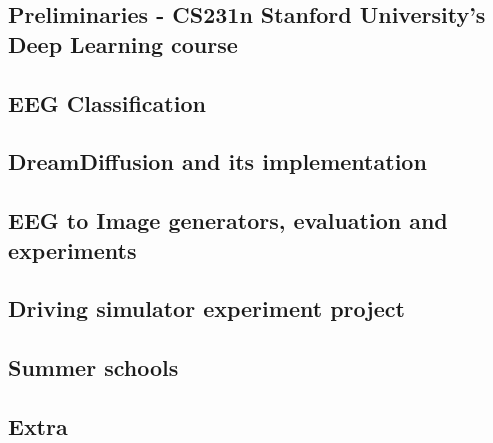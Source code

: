 \subsection{Preliminaries - CS231n Stanford University's Deep Learning course}


\subsection{EEG Classification}


\subsection{DreamDiffusion and its implementation}


\subsection{EEG to Image generators, evaluation and experiments}


\subsection{Driving simulator experiment project}


\subsection{Summer schools}


\subsection{Extra}
